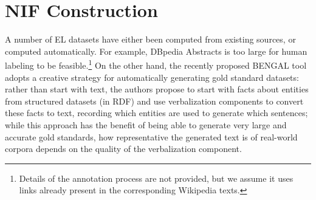 \documentclass[sigconf]{acmart}
\begin{document}

\section{NIF Construction}

A number of EL datasets have either been computed from existing sources, or computed automatically. For example, DBpedia Abstracts is too large for human labeling to be feasible.\footnote{Details of the annotation process are not provided, but we assume it uses links already present in the corresponding Wikipedia texts.} On the other hand, the recently proposed BENGAL tool~\cite{Bengal2018} adopts a creative strategy for automatically generating gold standard datasets: rather than start with text, the authors propose to start with facts about entities from structured datasets (in RDF) and use verbalization components to convert these facts to text, recording which entities are used to generate which sentences; while this approach has the benefit of being able to generate very large and accurate gold standards, how representative the generated text is of real-world corpora depends on the quality of the verbalization component.
 
\end{document}
